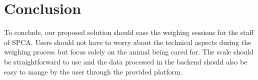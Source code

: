 
\chapter{Conclusion}

To conclude, our proposed solution should ease the weighing sessions for the staff of SPCA. Users should not have to worry about the technical aspects during the weighing process but focus solely on the animal being cared for. The scale should be straightforward to use and the data processed in the backend should also be easy to mange by the user through the provided platform.
